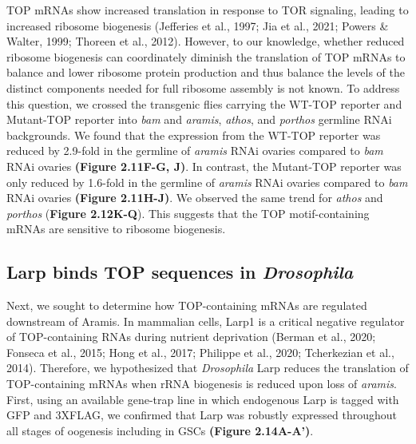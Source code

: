 \documentclass[12pt,oneside]{reedthesis}
\begin{document}
TOP mRNAs show increased translation in response to TOR signaling,
leading to increased ribosome biogenesis
(Jefferies et al., 1997; Jia et al., 2021; Powers \& Walter, 1999; Thoreen et al., 2012). However, to our knowledge,
whether reduced ribosome biogenesis can coordinately diminish the
translation of TOP mRNAs to balance and lower ribosome protein
production and thus balance the levels of the distinct components needed
for full ribosome assembly is not known. To address this question, we
crossed the transgenic flies carrying the WT-TOP reporter and Mutant-TOP
reporter into \emph{bam} and \emph{aramis}, \emph{athos}, and \emph{porthos} germline RNAi
backgrounds. We found that the expression from the WT-TOP reporter was
reduced by 2.9-fold in the germline of \emph{aramis} RNAi ovaries compared to
\emph{bam} RNAi ovaries \textbf{(Figure 2.11F-G, J)}. In contrast, the Mutant-TOP
reporter was only reduced by 1.6-fold in the germline of \emph{aramis} RNAi
ovaries compared to \emph{bam} RNAi ovaries \textbf{(Figure 2.11H-J)}. We observed
the same trend for \emph{athos} and \emph{porthos} (\textbf{Figure 2.12K-Q}). This
suggests that the TOP motif-containing mRNAs are sensitive to ribosome
biogenesis.

\hypertarget{larp-binds-top-sequences-in-drosophila}{%
\subsection{\texorpdfstring{Larp binds TOP sequences in \emph{Drosophila}}{Larp binds TOP sequences in Drosophila}}\label{larp-binds-top-sequences-in-drosophila}}

Next, we sought to determine how TOP-containing mRNAs are regulated
downstream of Aramis. In mammalian cells, Larp1 is a critical negative
regulator of TOP-containing RNAs during nutrient deprivation
(Berman et al., 2020; Fonseca et al., 2015; Hong et al., 2017; Philippe et al., 2020; Tcherkezian et al., 2014). Therefore, we
hypothesized that \emph{Drosophila} Larp reduces the translation of
TOP-containing mRNAs when rRNA biogenesis is reduced upon loss of
\emph{aramis}. First, using an available gene-trap line in which endogenous
Larp is tagged with GFP and 3XFLAG, we confirmed that Larp was robustly
expressed throughout all stages of oogenesis including in GSCs \textbf{(Figure 2.14A-A')}.
\end{document}
